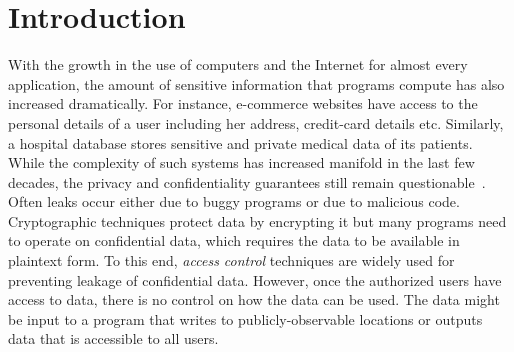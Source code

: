 \chapter{Introduction}

With the growth in the use of computers and the Internet for almost
every application, the amount of sensitive information that 
programs compute has also increased dramatically. For instance,
e-commerce websites have access to the personal details of a user
including her address, credit-card details etc. Similarly, a hospital
database stores sensitive and private medical data of its
patients. While the complexity  of such systems has increased
manifold in the last few decades, the privacy and confidentiality
guarantees still remain questionable~\citep{infoleaks}. Often leaks
occur either due to buggy programs or due to malicious
code. Cryptographic techniques protect data by encrypting it but many 
programs need to operate on confidential data, which requires the data 
to be available in plaintext form. %
To this end, \emph{access control} techniques are widely used
for preventing leakage of confidential data. However, once the
authorized users have access to data, there is no control on how the
data can be used. The data might be input to a program that writes to
publicly-observable locations or outputs data that is accessible to
all users.  

